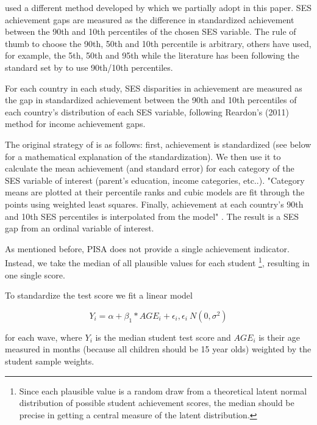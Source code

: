 \documentclass[11pt, a4paper]{article}\usepackage[]{graphicx}\usepackage[]{color}
\begin{document}
\citet{reardon_portilla, anna2016, anna2016_global} used a different method developed by \citet{reardon2011} which we partially adopt in this paper. SES achievement gaps are measured as the difference in standardized achievement between the 90th and 10th percentiles of the chosen SES variable. The rule of thumb to choose the 90th, 50th and 10th percentile is arbitrary, others have used, for example, the 5th, 50th and 95th \citep{micklewright} while the literature has been following the standard set by \citet{reardon2011} to use 90th/10th percentiles.

For each country in each study, SES disparities in achievement are measured as the gap in standardized achievement between the 90th and 10th percentiles of each country’s distribution of each SES variable, following Reardon’s (2011) method for income achievement gaps.

The original strategy of \citet{reardon2011} is as follows: first, achievement is standardized (see below for a mathematical explanation of the standardization). We then use it to calculate the mean achievement (and standard error) for each category of the SES variable of interest (parent's education, income categories, etc..). "Category means are plotted at their percentile ranks and cubic models are fit through the points using weighted least squares. Finally, achievement at each country’s 90th and 10th SES percentiles is interpolated from the model" \citep{anna2016_global}. The result is a SES gap from an ordinal variable of interest.

As mentioned before, PISA does not provide a single achievement indicator. Instead, we take the median of all plausible values for each student \footnote{Since each plausible value is a random draw from a theoretical latent normal distribution of possible student achievement scores, the median should be precise in getting a central measure of the latent distribution.}, resulting in one single score.

To standardize the test score we fit a linear model

\begin{equation}
Y_i = \alpha + \beta_1 * AGE_i + \epsilon_i, \epsilon_i ~ N(0, \sigma^2)
\end{equation}

for each wave,  where \begin{math}Y_i\end{math} is the median student test score and \begin{math}AGE_i\end{math} is their age measured in months (because all children should be 15 year olds) weighted by the student sample weights.
\end{document}
